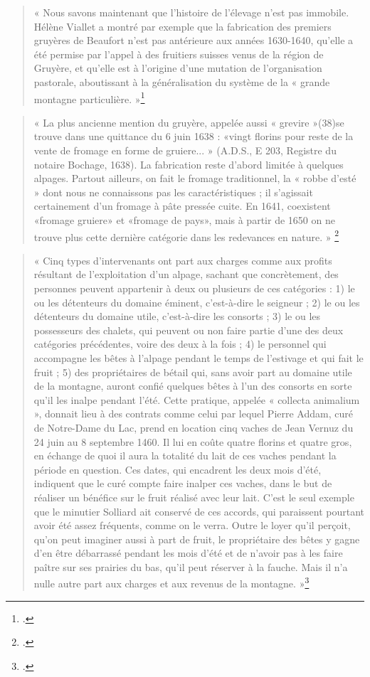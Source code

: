 \documentclass[12pt,a4paper]{report}
\begin{document}
	\begin{quote}
		« Nous savons maintenant que l’histoire de l’élevage n’est pas immobile. Hélène Viallet a montré par exemple que la fabrication des premiers gruyères de Beaufort n’est pas antérieure aux années 1630-1640, qu’elle a été permise par l’appel à des fruitiers suisses venus de la région de Gruyère, et qu’elle est à l’origine d’une mutation de l’organisation pastorale, aboutissant à la généralisation du système de la « grande montagne particulière. »\footcite[317--319]{Carrier2001VieMontagnardeFaucigny}
	\end{quote}	
	\begin{quote}
		« La plus ancienne mention du gruyère, appelée aussi « grevire »(38)se trouve dans une quittance du 6 juin 1638 : «vingt florins pour reste de la vente de fromage en forme de gruiere... » (A.D.S., E 203, Registre du notaire Bochage, 1638). La fabrication reste d'abord limitée à quelques alpages. Partout ailleurs, on fait le fromage traditionnel, la « robbe d'esté » dont nous ne connaissons pas les caractéristiques ; il s'agissait certainement d'un fromage à pâte pressée cuite. En 1641, coexistent «fromage gruiere» et «fromage de pays», mais à partir de 1650 on ne trouve plus cette dernière catégorie dans les redevances en nature. »
		\footcite[96]{HViallet1993}
	\end{quote}
	\begin{quote}
		« Cinq types d’intervenants ont part aux charges comme aux profits résultant de l’exploitation d’un alpage, sachant que concrètement, des personnes peuvent appartenir à deux ou plusieurs de ces catégories : 1) le ou les détenteurs du domaine éminent, c’est-à-dire le seigneur ; 2) le ou les détenteurs du domaine utile, c’est-à-dire les consorts ; 3) le ou les possesseurs des chalets, qui peuvent ou non faire partie d’une des deux catégories précédentes, voire des deux à la fois ; 4) le personnel qui accompagne les bêtes à l’alpage pendant le temps de l’estivage et qui fait le fruit ; 5) des propriétaires de bétail qui, sans avoir part au domaine utile de la montagne, auront confié quelques bêtes à l’un des consorts en sorte qu’il les inalpe pendant l’été. Cette pratique, appelée « collecta animalium », donnait lieu à des contrats comme celui par lequel Pierre Addam, curé de Notre-Dame du Lac, prend en location cinq vaches de Jean Vernuz du 24 juin au 8 septembre 1460. Il lui en coûte quatre florins et quatre gros, en échange de quoi il aura la totalité du lait de ces vaches pendant la période en question. Ces dates, qui encadrent les deux mois d’été, indiquent que le curé compte faire inalper ces vaches, dans le but de réaliser un bénéfice sur le fruit réalisé avec leur lait. C’est le seul exemple que le minutier Solliard ait conservé de ces accords, qui paraissent pourtant avoir été assez fréquents, comme on le verra. Outre le loyer qu’il perçoit, qu’on peut imaginer aussi à part de fruit, le propriétaire des bêtes y gagne d’en être débarrassé pendant les mois d’été et de n’avoir pas à les faire paître sur ses prairies du bas, qu’il peut réserver à la fauche. Mais il n’a nulle autre part aux charges et aux revenus de la montagne. »\footcite[330]{Carrier2001VieMontagnardeFaucigny}
	\end{quote}	
	
\end{document}
